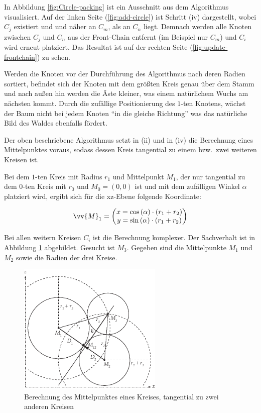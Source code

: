 In Abbildung \ref{fig:Circle-packing} ist ein Ausschnitt aus dem Algorithmus visualisiert. Auf der linken Seite (\ref{fig:add-circle}) ist Schritt (iv) dargestellt, wobei $C_j$ existiert und und näher an $C_m$, als an $C_n$ liegt. Demnach werden alle Knoten zwischen $C_j$ und $C_n$ aus der Front-Chain entfernt (im Beispiel nur $C_m$) und $C_i$ wird erneut platziert. Das Resultat ist auf der rechten Seite (\ref{fig:update-frontchain}) zu sehen.

Werden die Knoten vor der Durchführung des Algorithmus nach deren Radien sortiert, befindet sich der Knoten mit dem größten Kreis genau über dem Stamm und nach außen hin werden die Äste kleiner, was einem natürlichem Wuchs am nächsten kommt. Durch die zufällige Positionierung des $1$-ten Knotens, wächst der Baum nicht bei jedem Knoten "`in die gleiche Richtung"' was das natürliche Bild des Waldes ebenfalls fördert.

Der oben beschriebene Algorithmus setzt in (ii) und in (iv) die Berechnung eines Mittelpunktes voraus, sodass dessen Kreis tangential zu einem bzw.\ zwei weiteren Kreisen ist.

Bei dem $1$-ten Kreis mit Radius $r_1$ und Mittelpunkt $M_1$, der nur tangential zu dem $0$-ten Kreis mit $r_0$ und $M_0 = (0,0)$ ist und mit dem zufälligen Winkel $\alpha$ platziert wird, ergibt sich für die xz-Ebene folgende Koordinate:

\begin{equation}
  \vv{M}_1 =
  \begin{pmatrix}
    x = \cos\left(\alpha\right) \cdot \left(r_1 + r_2\right)\\
    y = \sin\left(\alpha\right) \cdot \left(r_1 + r_2\right)\\
  \end{pmatrix}
\end{equation}

Bei allen weitern Kreisen $C_i$ ist die Berechnung komplexer. Der Sachverhalt ist in Abbildung \ref{fig:tangent-circle} abgebildet. Gesucht ist $M_3$. Gegeben sind die Mittelpunkte $M_1$ und $M_2$ sowie die Radien der drei Kreise.

\begin{figure}[htb]
  \includegraphics[width=261.593px]{figures/tangent-circle}
  \caption{Berechnung des Mittelpunktes eines Kreises, tangential zu zwei anderen Kreisen}
  \label{fig:tangent-circle}
\end{figure}


